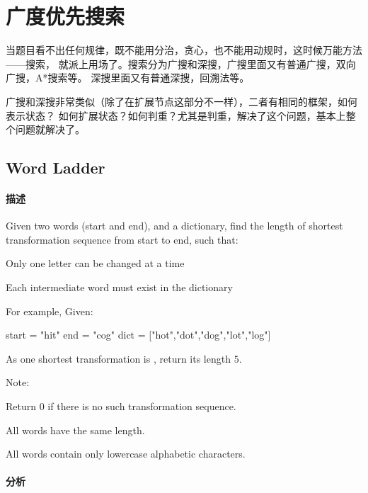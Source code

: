 \chapter{广度优先搜索}
当题目看不出任何规律，既不能用分治，贪心，也不能用动规时，这时候万能方法——搜索，
就派上用场了。搜索分为广搜和深搜，广搜里面又有普通广搜，双向广搜，A*搜索等。
深搜里面又有普通深搜，回溯法等。

广搜和深搜非常类似（除了在扩展节点这部分不一样），二者有相同的框架，如何表示状态？
如何扩展状态？如何判重？尤其是判重，解决了这个问题，基本上整个问题就解决了。


\section{Word Ladder} %
\label{sec:word-ladder}


\subsubsection{描述}
Given two words (start and end), and a dictionary, find the length of shortest transformation sequence from start to end, such that:
\begindot
\item Only one letter can be changed at a time
\item Each intermediate word must exist in the dictionary
\myenddot

For example, Given:

\begin{Code}
start = "hit"
end = "cog"
dict = ["hot","dot","dog","lot","log"]
\end{Code}
As one shortest transformation is , return its length $5$.

Note:
\begindot
\item Return 0 if there is no such transformation sequence.
\item All words have the same length.
\item All words contain only lowercase alphabetic characters.
\myenddot


\subsubsection{分析}


